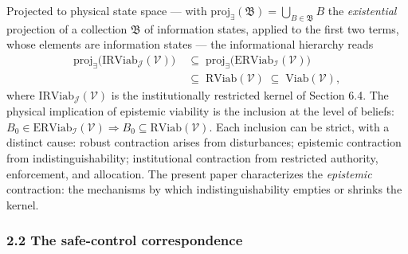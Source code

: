 \documentclass[10pt,twocolumn]{article}
\theoremstyle{definition}
\begin{document}
Projected to physical state space --- with
\(\mathrm{proj}_{\exists}(\mathfrak{B}) = \bigcup_{B \in \mathfrak{B}} B\)
the \emph{existential} projection of a collection \(\mathfrak{B}\) of
information states, applied to the first two terms, whose elements are information states --- the informational hierarchy
reads
\[
\begin{aligned}
\mathrm{proj}_{\exists}\big(\mathrm{IRViab}_{\mathcal{J}}(\mathcal{V})\big)&\;\subseteq\; \mathrm{proj}_{\exists}\big(\mathrm{ERViab}_{\mathcal{I}}(\mathcal{V})\big) \\
&\;\subseteq\; \mathrm{RViab}(\mathcal{V}) \;\subseteq\; \mathrm{Viab}(\mathcal{V}),
\end{aligned}
\]
where \(\mathrm{IRViab}_{\mathcal{J}}(\mathcal{V})\) is the institutionally restricted kernel of Section 6.4. The physical implication of epistemic viability is the
inclusion at the level of beliefs:
\(B_0 \in \mathrm{ERViab}_{\mathcal{I}}(\mathcal{V}) \Rightarrow B_0 \subseteq \mathrm{RViab}(\mathcal{V})\).
Each inclusion can be strict, with a distinct cause: robust contraction
arises from disturbances; epistemic contraction from
indistinguishability; institutional contraction from restricted
authority, enforcement, and allocation. The present paper characterizes
the \emph{epistemic} contraction: the mechanisms by which
indistinguishability empties or shrinks the kernel.

\subsubsection{2.2 The safe-control
correspondence}\label{calc-the-safe-control-correspondence}
\end{document}
